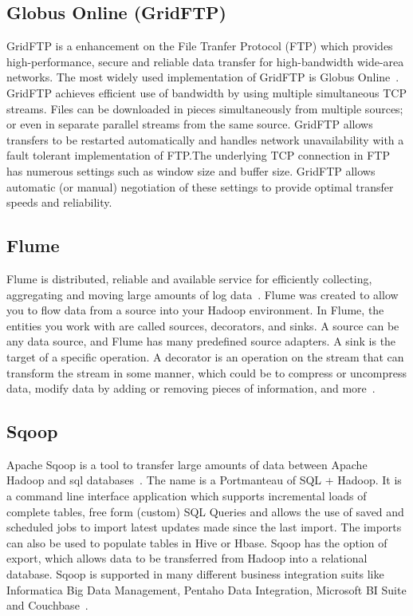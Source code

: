      \pv

\subsection{Globus Online (GridFTP)}

GridFTP is a enhancement on the File Tranfer Protocol (FTP) which
provides high-performance, secure and reliable data transfer for
high-bandwidth wide-area networks. The most widely used implementation
of GridFTP is Globus Online~\cite{www-GlobusOnline}. GridFTP achieves
efficient use of bandwidth by using multiple simultaneous TCP streams.
Files can be downloaded in pieces simultaneously from multiple
sources; or even in separate parallel streams from the same
source. GridFTP allows transfers to be restarted automatically and
handles network unavailability with a fault tolerant implementation of
FTP.The underlying TCP connection in FTP has numerous settings such as
window size and buffer size. GridFTP allows automatic (or manual)
negotiation of these settings to provide optimal transfer speeds and
reliability.

     \pv


\subsection{Flume}

Flume is distributed, reliable and available service for efficiently
collecting, aggregating and moving large amounts of log
data~\cite{apache-flume}. Flume was created to allow you to flow data
from a source into your Hadoop environment.  In Flume, the entities
you work with are called sources, decorators, and sinks. A source can
be any data source, and Flume has many predefined source adapters. A
sink is the target of a specific operation. A decorator is an
operation on the stream that can transform the stream in some manner,
which could be to compress or uncompress data, modify data by adding
or removing pieces of information, and more~\cite{ibm-flume}.

\subsection{Sqoop}
     
Apache Sqoop is a tool to transfer large amounts of data between
Apache Hadoop and sql databases~\cite{www-sqoop}. The name is a
Portmanteau of SQL + Hadoop. It is a command line interface
application which supports incremental loads of complete tables, free
form (custom) SQL Queries and allows the use of saved and scheduled
jobs to import latest updates made since the last import. The imports
can also be used to populate tables in Hive or Hbase. Sqoop has the
option of export, which allows data to be transferred from Hadoop into
a relational database. Sqoop is supported in many different business
integration suits like Informatica Big Data Management, Pentaho Data
Integration, Microsoft BI Suite and Couchbase~\cite{sqoop-wiki}.

